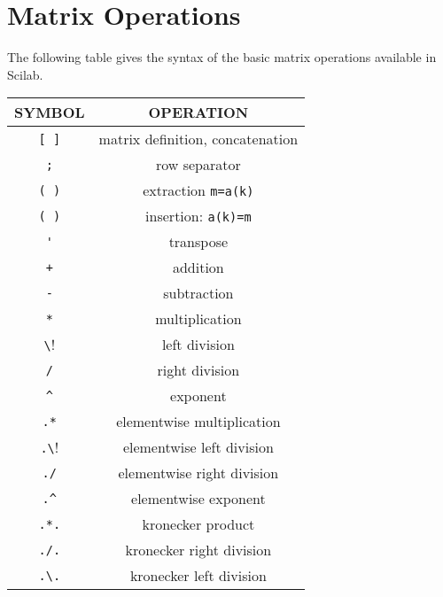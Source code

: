 \section{Matrix Operations}
The following table gives the syntax of the basic matrix operations
available in Scilab.

\begin{center}
\begin{tabular}{|c|c|}
\hline
SYMBOL & OPERATION 
\\ \hline \hline
\verb![ ]! & matrix definition, concatenation\\ \hline

\verb!;! & row separator\\ \hline

\verb!( )! & extraction \verb!m=a(k)! \\ \hline

\verb!( )! & insertion:  \verb!a(k)=m!  \\ \hline

\verb!'! & transpose \\ \hline

\verb!+! & addition  \\ \hline

\verb!-! & subtraction \\ \hline

\verb!*! & multiplication \\ \hline

\verb!\! & left division \\ \hline

\verb!/! & right division \\ \hline

\verb!^! &  exponent \\ \hline

\verb!.*! & elementwise multiplication  \\ \hline

\verb!.\! &  elementwise left division  \\ \hline

\verb!./! &  elementwise right division  \\ \hline

\verb!.^! &  elementwise exponent  \\ \hline

\verb!.*.! & kronecker product \\ \hline

\verb!./.! & kronecker right division \\ \hline

\verb!.\.! &  kronecker left division \\ \hline  
\end{tabular}
\end{center}

